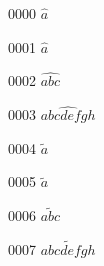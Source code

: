 \documentclass{article}
\begin{document}
0000 $\widehat{a}$\par
0001 $\displaystyle\widehat{a}$\par
0002 $\widehat{abc}$\par
0003 $\widehat{abcdefgh}$\par
0004 $\widetilde{a}$\par
0005 $\displaystyle\widetilde{a}$\par
0006 $\widetilde{abc}$\par
0007 $\widetilde{abcdefgh}$\par
\end{document}
